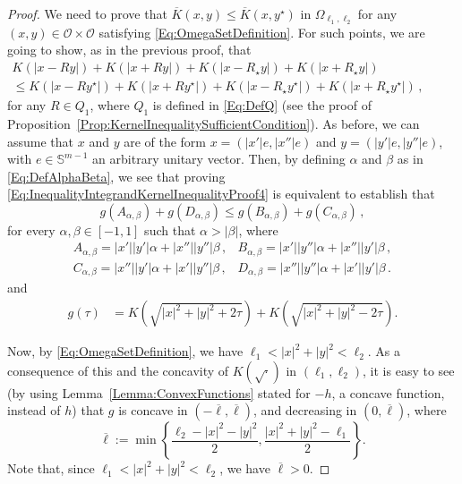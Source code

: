 \documentclass[12pt,reqno]{amsart}
\theoremstyle{definition}
\theoremstyle{remark}
\newcommand{\con}[1]{\mathbb{#1}}
\newcommand{\Sph}{\con{S}} %
\newcommand{\ocal}{\mathcal{O}}
\numberwithin{equation}{section}
\begin{document}
\begin{proof}
		We need to prove that $\overline{K}(x,y) \leq \overline{K}(x, y^\star)$ in $\Omega_{\ell_1,\ell_2}$ for any $(x,y)\in \ocal\times \ocal$ satisfying \eqref{Eq:OmegaSetDefinition}. For such points, we are going to show, as in the previous proof, that
		\begin{equation}
		\label{Eq:InequalityIntegrandKernelInequalityProof4}
		\begin{split}
		K(|x - R y|) + K(|x + R y|) + K(|x - R_\star y|) + K(|x + R_\star y|)
		\quad \quad \quad \quad \quad \quad
		\\
		\leq
		K(|x - R y^\star|) + K(|x + R y^\star|)+K(|x - R_\star y^\star|) + K(|x + R_\star y^\star|)\,, 
		\end{split}
		\end{equation}
		for any $R\in Q_1$, where $Q_1$ is defined in \eqref{Eq:DefQ} (see the proof of Proposition~\ref{Prop:KernelInequalitySufficientCondition}). As before, we can assume that $x$ and $y$ are of the form $x = (|x'|e, |x''|e)$ and $y = (|y'|e, |y''|e)$, with $e \in \Sph^{m-1}$ an arbitrary unitary vector. Then, by defining $\alpha$ and $\beta$ as in \eqref{Eq:DefAlphaBeta}, we see that proving \eqref{Eq:InequalityIntegrandKernelInequalityProof4} is equivalent to establish that
		\begin{equation}
		\label{Eq:InequalityIntegrandKernelInequalityProof5}
		g(A_{\alpha,\beta}) + g(D_{\alpha,\beta}) \leq g(B_{\alpha,\beta}) + g(C_{\alpha,\beta})\,,
		\end{equation}
		for every $\alpha, \beta \in [-1,1]$ such that $\alpha>|\beta|$, where
		$$
		\begin{array}{cc}
		A_{\alpha,\beta} = |x'||y'|  \alpha + |x''||y''|\beta \,, &
		B_{\alpha,\beta} = |x'||y''| \alpha + |x''||y'| \beta \,, \\
		C_{\alpha,\beta} = |x''||y'| \alpha + |x'||y''| \beta \,, &
		D_{\alpha,\beta} = |x''||y''|\alpha + |x'||y'|  \beta \,.
		\end{array}
		$$
		and
		\begin{align*}
		g(\tau) &= K\left( \sqrt{|x|^2+|y|^2+2\tau} \right) + K\left( \sqrt{|x|^2+|y|^2-2\tau} \right).
		\end{align*}
		
		
		
		Now, by \eqref{Eq:OmegaSetDefinition}, we have $\ell_1 < |x|^2+|y|^2 <\ell_2$. As a consequence of this and the concavity of $K(\sqrt{\cdot})$ in $(\ell_1,\ell_2)$, it is easy to see (by using Lemma~\ref{Lemma:ConvexFunctions} stated for $-h$, a concave function, instead of $h$) that $g$ is concave in $ \left( -\overline{\ell}, \overline{\ell}\right) $, and decreasing in $(0,\overline{\ell})$, where 
		$$
		\overline{\ell} := \min{\left\{\frac{\ell_2-|x|^2-|y|^2}{2},\frac{|x|^2+|y|^2-\ell_1}{2}\right\}}.$$
		Note that, since $\ell_1 < |x|^2+|y|^2 <\ell_2$, we have $\overline{\ell}>0$.
		

\end{proof}
\end{document}
